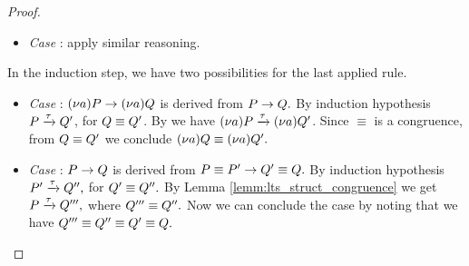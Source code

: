 \begin{proof}
\begin{itemize}


\item \emph{Case} : apply similar reasoning.
\end{itemize}

In the induction step, we have two possibilities for the last applied rule.
\begin{itemize}
\item \emph{Case} : $(\nu a)P\rightarrow(\nu a)Q$ is derived from $P\rightarrow Q.$ By induction hypothesis $P\xrightarrow{\tau}Q'$, for $Q\equiv Q'$. By  we have $(\nu a)P\xrightarrow{\tau}(\nu a)Q'$. Since $\equiv$ is a congruence, from $Q\equiv Q'$ we conclude $(\nu a)Q\equiv (\nu a)Q'.$

\item \emph{Case} : $P\rightarrow Q$ is derived from $P\equiv P'\rightarrow Q'\equiv Q.$ By induction hypothesis $P'\xrightarrow{\tau}Q'',$ for $Q'\equiv Q''.$  By Lemma \ref{lemm:lts_struct_congruence} we get $P\xrightarrow{\tau}Q''',$ where $Q'''\equiv Q''.$ Now we can conclude the case by noting that we have $Q'''\equiv Q''\equiv Q'\equiv Q.$
\end{itemize}
\end{proof}

